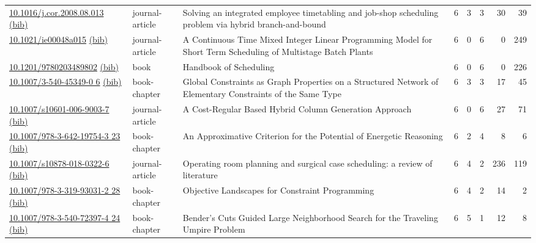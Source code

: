 {\begin{longtable}{p{5cm}lp{11cm}rrrrr}
\href{http://dx.doi.org/10.1016/j.cor.2008.08.013}{10.1016/j.cor.2008.08.013} \href{https://www.doi2bib.org/bib/10.1016/j.cor.2008.08.013}{(bib)} & journal-article & Solving an integrated employee timetabling and job-shop scheduling problem via hybrid branch-and-bound & 6 & 3 & 3 & 30 & 39 \\
\href{http://dx.doi.org/10.1021/ie00048a015}{10.1021/ie00048a015} \href{https://www.doi2bib.org/bib/10.1021/ie00048a015}{(bib)} & journal-article & A Continuous Time Mixed Integer Linear Programming Model for Short Term Scheduling of Multistage Batch Plants & 6 & 0 & 6 & 0 & 249 \\
\href{http://dx.doi.org/10.1201/9780203489802}{10.1201/9780203489802} \href{https://www.doi2bib.org/bib/10.1201/9780203489802}{(bib)} & book & Handbook of Scheduling & 6 & 0 & 6 & 0 & 226 \\
\href{http://dx.doi.org/10.1007/3-540-45349-0_6}{10.1007/3-540-45349-0 6} \href{https://www.doi2bib.org/bib/10.1007/3-540-45349-0_6}{(bib)} & book-chapter & Global Constraints as Graph Properties on a Structured Network of Elementary Constraints of the Same Type & 6 & 3 & 3 & 17 & 45 \\
\href{http://dx.doi.org/10.1007/s10601-006-9003-7}{10.1007/s10601-006-9003-7} \href{https://www.doi2bib.org/bib/10.1007/s10601-006-9003-7}{(bib)} & journal-article & A Cost-Regular Based Hybrid Column Generation Approach & 6 & 0 & 6 & 27 & 71 \\
\href{http://dx.doi.org/10.1007/978-3-642-19754-3_23}{10.1007/978-3-642-19754-3 23} \href{https://www.doi2bib.org/bib/10.1007/978-3-642-19754-3_23}{(bib)} & book-chapter & An Approximative Criterion for the Potential of Energetic Reasoning & 6 & 2 & 4 & 8 & 6 \\
\href{http://dx.doi.org/10.1007/s10878-018-0322-6}{10.1007/s10878-018-0322-6} \href{https://www.doi2bib.org/bib/10.1007/s10878-018-0322-6}{(bib)} & journal-article & Operating room planning and surgical case scheduling: a review of literature & 6 & 4 & 2 & 236 & 119 \\
\href{http://dx.doi.org/10.1007/978-3-319-93031-2_28}{10.1007/978-3-319-93031-2 28} \href{https://www.doi2bib.org/bib/10.1007/978-3-319-93031-2_28}{(bib)} & book-chapter & Objective Landscapes for Constraint Programming & 6 & 4 & 2 & 14 & 2 \\
\href{http://dx.doi.org/10.1007/978-3-540-72397-4_24}{10.1007/978-3-540-72397-4 24} \href{https://www.doi2bib.org/bib/10.1007/978-3-540-72397-4_24}{(bib)} & book-chapter & Bender's Cuts Guided Large Neighborhood Search for the Traveling Umpire Problem & 6 & 5 & 1 & 12 & 8 \\

\end{longtable}}
